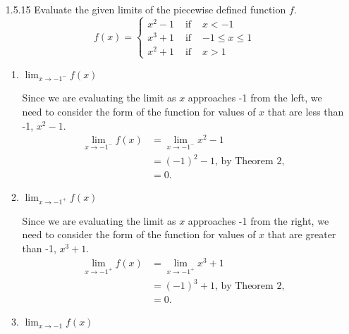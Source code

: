 \begin{enumerate}
\item[1.5.15] Evaluate the given limits of the piecewise defined function $f$.
$$f(x) = \left\{\begin{array}{lcl}
x^2 - 1 & \text{ if }& x < -1 \\
x^3 + 1 & \text{ if } & -1 \leq x \leq 1 \\
x^2 + 1 & \text{ if } & x > 1
\end{array}\right.$$


\begin{enumerate} %
\item $\displaystyle{\lim_{x \rightarrow -1^-} f(x)}$

Since we are evaluating the limit as $x$ approaches -1 from the left, we need to consider the form of the function for values of $x$ that are less than -1, $x^2 - 1$.
\begin{align*}
\lim_{x \rightarrow -1^-} f(x) & = \lim_{x \rightarrow -1^-} x^2 - 1\\
& = (-1)^2 - 1 \text{, by Theorem 2,}\\
& = 0.
\end{align*}

\bigskip %

\item $\displaystyle{\lim_{x \rightarrow -1^+} f(x)}$

Since we are evaluating the limit as $x$ approaches -1 from the right, we need to consider the form of the function for values of $x$ that are greater than -1, $x^3 + 1$.
\begin{align*}
\lim_{x \rightarrow -1^+} f(x) & = \lim_{x \rightarrow -1^+} x^3 + 1\\
& = (-1)^3 + 1 \text{, by Theorem 2,}\\
& = 0.
\end{align*}

\bigskip

\item $\displaystyle{\lim_{x \rightarrow -1} f(x)}$


\end{enumerate}
\end{enumerate}
